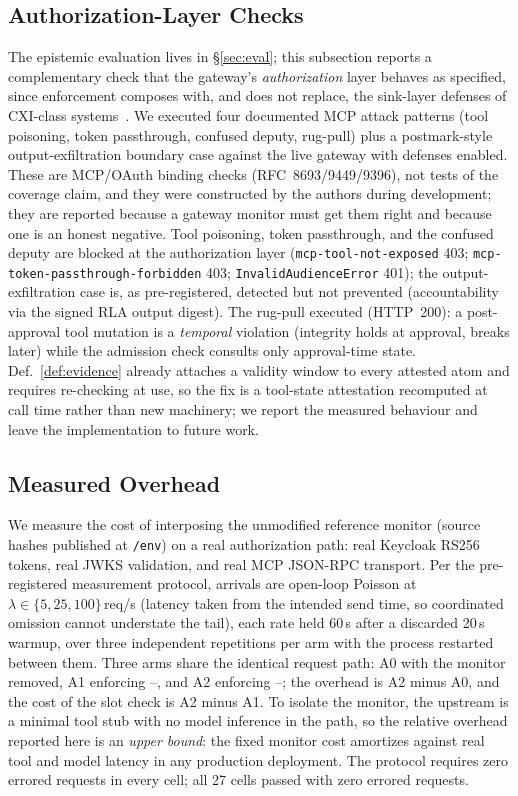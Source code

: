 \subsection{Authorization-Layer Checks}
\label{sec:redteam}
The epistemic evaluation lives in \S\ref{sec:eval}; this subsection
reports a complementary check that the gateway's \emph{authorization}
layer behaves as specified, since \DEI{} enforcement composes with,
and does not replace, the sink-layer defenses of CXI-class
systems~\cite{cxi,camel}. We executed four documented MCP attack
patterns (tool poisoning, token passthrough, confused deputy, rug-pull)
plus a postmark-style output-exfiltration boundary case against the
live gateway with defenses enabled. These are MCP/OAuth binding checks
(RFC~8693/9449/9396), not tests of the coverage claim, and they were
constructed by the authors during development; they are reported
because a gateway monitor must get them right and because one is an
honest negative. Tool poisoning, token passthrough, and the confused
deputy are blocked at the authorization layer (\texttt{mcp-tool-not-exposed}
403; \texttt{mcp-token-passthrough-forbidden} 403;
\texttt{InvalidAudienceError} 401); the output-exfiltration case is,
as pre-registered, detected but not prevented (accountability via the
signed RLA output digest). The rug-pull executed (HTTP~200): a
post-approval tool mutation is a \emph{temporal} \Itwo{} violation
(integrity holds at approval, breaks later) while the admission check
consults only approval-time state. Def.~\ref{def:evidence} already
attaches a validity window to every attested atom and requires
re-checking at use, so the fix is a tool-state attestation recomputed at
call time rather than new machinery; we report the measured behaviour
and leave the implementation to future work.

\subsection{Measured Overhead}
\label{sec:overhead}
We measure the cost of interposing the unmodified reference
monitor (source hashes published at \texttt{/env}) on a real
authorization path: real Keycloak RS256 tokens, real JWKS
validation, and real MCP JSON-RPC transport. Per the
pre-registered measurement protocol, arrivals are open-loop
Poisson at $\lambda \in \{5, 25, 100\}$\,req/s (latency taken from
the intended send time, so coordinated omission cannot understate
the tail), each rate held 60\,s after a discarded 20\,s warmup,
over three independent repetitions per arm with the process
restarted between them. Three arms share the identical request path:
A0 with the monitor removed, A1 enforcing \Ione--\Ithree, and A2
enforcing \Ione--\Ifour; the overhead is A2 minus A0, and the cost of
the \Ifour{} slot check is A2 minus A1. To isolate the monitor, the
upstream is a minimal tool stub with no model inference in the path, so
the relative overhead reported here is an \emph{upper bound}: the fixed
monitor cost amortizes against real tool and model latency in any
production deployment. The protocol requires zero errored requests in
every cell; all 27 cells passed with zero errored requests.

